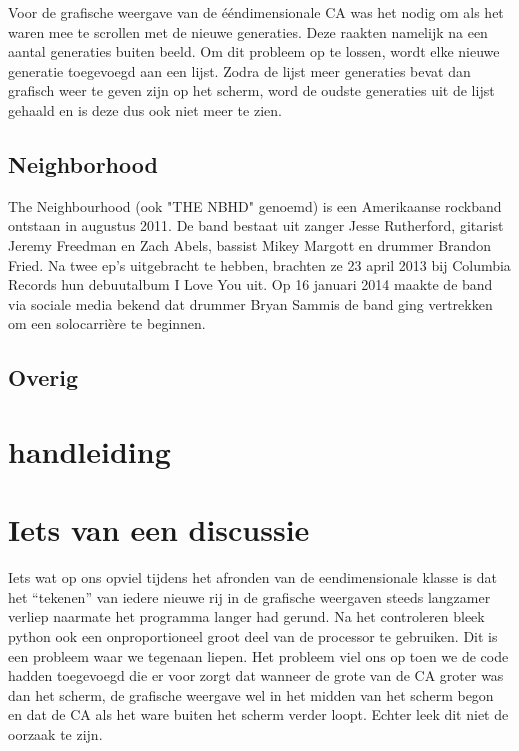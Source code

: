 \documentclass{article}
\begin{document}
Voor de grafische weergave van de ééndimensionale CA was het nodig om als het waren mee te scrollen met de nieuwe generaties. Deze raakten namelijk na een aantal generaties buiten beeld. Om dit probleem op te lossen, wordt elke nieuwe generatie toegevoegd aan een lijst. Zodra de lijst meer generaties bevat dan grafisch weer te geven zijn op het scherm, word de oudste generaties uit de lijst gehaald en is deze dus ook niet meer te zien.

\subsection{Neighborhood}
The Neighbourhood (ook "THE NBHD" genoemd) is een Amerikaanse rockband ontstaan in augustus 2011. De band bestaat uit zanger Jesse Rutherford, gitarist Jeremy Freedman en Zach Abels, bassist Mikey Margott en drummer Brandon Fried. Na twee ep's uitgebracht te hebben, brachten ze 23 april 2013 bij Columbia Records hun debuutalbum I Love You uit. Op 16 januari 2014 maakte de band via sociale media bekend dat drummer Bryan Sammis de band ging vertrekken om een solocarrière te beginnen.
\subsection{Overig}

\section{handleiding}

\section{Iets van een discussie}
Iets wat op ons opviel tijdens het afronden van de eendimensionale klasse is dat het “tekenen” van iedere nieuwe rij in de grafische weergaven steeds langzamer verliep naarmate het programma langer had gerund. Na het controleren bleek python ook een onproportioneel groot deel van de processor te gebruiken. Dit is een probleem waar we tegenaan liepen. Het probleem viel ons op toen we de code hadden toegevoegd die er voor zorgt dat wanneer de grote van de CA groter was dan het scherm, de grafische weergave wel in het midden van het scherm begon en dat de CA als het ware buiten het scherm verder loopt. Echter leek dit niet de oorzaak te zijn. 
\end{document}
